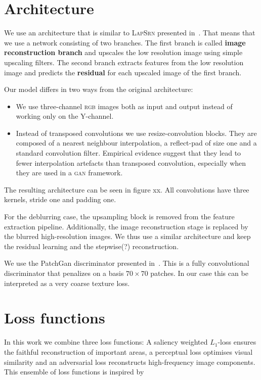 \documentclass{scrartcl}
\begin{document}
\section{Architecture}
We use an architecture that is similar to \textsc{LapSrn} presented in~\cite{LapSRN}.
That means that we use a network consisting of two branches.
The first branch is called \textbf{image reconstruction branch} and upscales the low resolution image using simple upscaling filters.
The second branch extracts features from the low resolution image and predicts the \textbf{residual} for each upscaled image of the first branch.

Our model differs in two ways from the original architecture:
\begin{itemize}
\item We use three-channel \textsc{rgb} images both as input and output instead of working only on the Y-channel.
\item Instead of transposed convolutions we use resize-convolution blocks.
  They are composed of a nearest neighbour interpolation, a reflect-pad of size one and a standard convolution filter.
  Empirical evidence suggest that they lead to fewer interpolation artefacts than transposed convolution, especially when they are used in a \textsc{gan} framework\cite{deconvolution}.
\end{itemize}
The resulting architecture can be seen in figure xx.
All convolutions have three kernels, stride one and padding one.

For the deblurring case, the upsampling block is removed from the feature extraction pipeline.
Additionally, the image reconstruction stage is replaced by the blurred high-resolution images.
We thus use a similar architecture and keep the residual learning and the stepwise(?) reconstruction.

We use the PatchGan discriminator presented in~\cite{PatchGAN}.
This is a fully convolutional discriminator that penalizes on a basis $70\times70$ patches.
In our case this can be interpreted as a very coarse texture loss.


\section{Loss functions}
In this work we combine three loss functions:
A saliency weighted $L_1$-loss ensures the faithful reconstruction of important areas, a perceptual loss optimises visual similarity and an adversarial loss reconstructs high-frequency image components.
This ensemble of loss functions is inspired by~\cite{SaliencyGAN}
\end{document}

